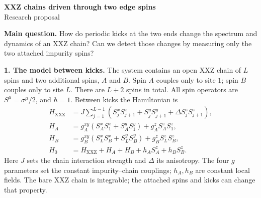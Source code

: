 \documentclass[10pt,a4paper]{article}
\begin{document}
\begin{center}
{\Large\bfseries XXZ chains driven through two edge spins}\\[2pt]
{\normalsize Research proposal}
\end{center}
\vspace{-5pt}

\textbf{Main question.}
How do periodic kicks at the two ends change the spectrum and dynamics of an XXZ chain?
Can we detect those changes by measuring only the two attached impurity spins?

\textbf{1. The model between kicks.}
The system contains an open XXZ chain of $L$ spins and two additional spins, $A$ and $B$.
Spin $A$ couples only to site $1$; spin $B$ couples only to site $L$.
There are $L+2$ spins in total. All spin operators are $S^\mu=\sigma^\mu/2$, and $\hbar=1$.
Between kicks the Hamiltonian is
\[
\begin{aligned}
H_{\mathrm{XXZ}}&=J\sum_{j=1}^{L-1}
 \left(S_j^xS_{j+1}^x+S_j^yS_{j+1}^y+\Delta S_j^zS_{j+1}^z\right),\\
H_A&=g_A^{xy}\left(S_A^xS_1^x+S_A^yS_1^y\right)+g_A^zS_A^zS_1^z,\\
H_B&=g_B^{xy}\left(S_L^xS_B^x+S_L^yS_B^y\right)+g_B^zS_L^zS_B^z,\\
H_0&=H_{\mathrm{XXZ}}+H_A+H_B+h_AS_A^z+h_BS_B^z .
\end{aligned}
\]
Here $J$ sets the chain interaction strength and $\Delta$ its anisotropy.
The four $g$ parameters set the constant impurity--chain couplings; $h_A,h_B$ are constant local fields.
The bare XXZ chain is integrable; the attached spins and kicks can change that property.
\end{document}
